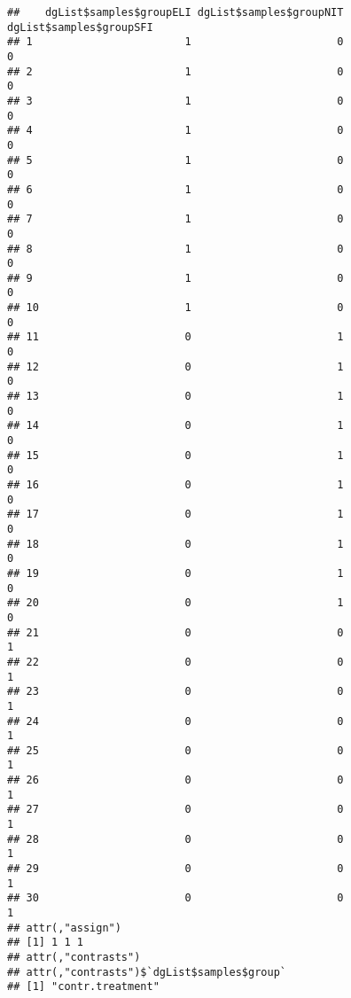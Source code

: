 \documentclass[
]{article}
\begin{document}
\begin{verbatim}
##    dgList$samples$groupELI dgList$samples$groupNIT dgList$samples$groupSFI
## 1                        1                       0                       0
## 2                        1                       0                       0
## 3                        1                       0                       0
## 4                        1                       0                       0
## 5                        1                       0                       0
## 6                        1                       0                       0
## 7                        1                       0                       0
## 8                        1                       0                       0
## 9                        1                       0                       0
## 10                       1                       0                       0
## 11                       0                       1                       0
## 12                       0                       1                       0
## 13                       0                       1                       0
## 14                       0                       1                       0
## 15                       0                       1                       0
## 16                       0                       1                       0
## 17                       0                       1                       0
## 18                       0                       1                       0
## 19                       0                       1                       0
## 20                       0                       1                       0
## 21                       0                       0                       1
## 22                       0                       0                       1
## 23                       0                       0                       1
## 24                       0                       0                       1
## 25                       0                       0                       1
## 26                       0                       0                       1
## 27                       0                       0                       1
## 28                       0                       0                       1
## 29                       0                       0                       1
## 30                       0                       0                       1
## attr(,"assign")
## [1] 1 1 1
## attr(,"contrasts")
## attr(,"contrasts")$`dgList$samples$group`
## [1] "contr.treatment"
\end{verbatim}
\end{document}
